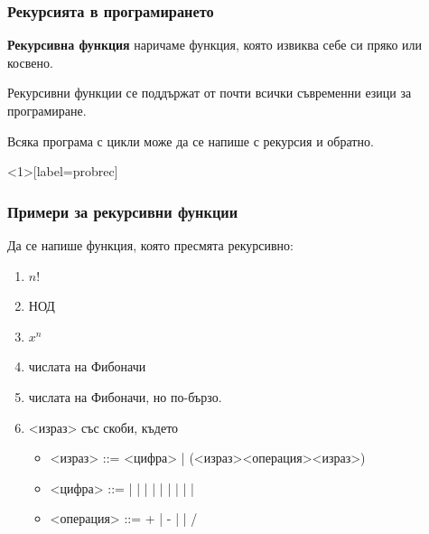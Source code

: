 \documentclass[alsotrans]{beamerswitch}
\begin{document}
\begin{frame}
  \frametitle{Рекурсията в програмирането}

  \begin{definition}
    \textbf{Рекурсивна функция} наричаме функция, която извиква себе си пряко или косвено.
  \end{definition}
  \pause
  \vspace{2em}
  Рекурсивни функции се поддържат от почти всички съвременни езици за програмиране.\\[2em]
  \pause
  \begin{theorem}
    Всяка програма с цикли може да се напише с рекурсия и обратно.
  \end{theorem}
\end{frame}

\begin{frame}<1>[label=probrec]
  \frametitle{Примери за рекурсивни функции}

  Да се напише функция, която пресмята рекурсивно:
  \begin{enumerate}[<+->]
  \item $n!$
  \item НОД
  \item $x^n$
  \item числата на Фибоначи
  \item числата на Фибоначи, но \alert{по-бързо}.
  \item{} <израз> със скоби, където
    \begin{itemize}[<.->]
    \item{} <израз> ::= <цифра> | \tta(<израз><операция><израз>\tta)
    \item{} <цифра> ::=  |  |  |  |  |  |  |  |  | 
    \item{} <операция> ::= \tta+ | \tta- | \tta* | \tta/
    \end{itemize}
  \end{enumerate}
\end{frame}
\end{document}
